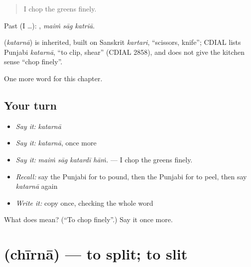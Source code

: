 \begin{quote}
I chop the greens finely.
\end{quote}

Past (I …):   , \emph{maiṁ sāg katriā}.

\begin{cousinweb}
\textbf{} (\emph{katarnā}) is inherited, built on Sanskrit \emph{kartari}, \textquotedblleft{}scissors, knife\textquotedblright{}; CDIAL lists Punjabi \emph{katarnā}, \textquotedblleft{}to clip, shear\textquotedblright{} (CDIAL 2858), and does not give the kitchen sense \textquotedblleft{}chop finely\textquotedblright{}.
\end{cousinweb}

\begin{grammarlens}[title={What you've built}]
One more word for this chapter.
\end{grammarlens}

\subsection*{Your turn}
\begin{itemize}
\raggedright
  \item \emph{Say it:} \emph{katarnā}
  \item \emph{Say it:} \emph{katarnā}, once more
  \item \emph{Say it:} \emph{maiṁ sāg katardī hāṁ.} — I chop the greens finely.
  \item \emph{Recall:} say the Punjabi for to pound, then the Punjabi for to peel, then say \emph{katarnā} again
  \item \emph{Write it:} copy \textbf{} once, checking the whole word
\end{itemize}

\begin{tcolorbox}[breakable,colback=teal!4,colframe=teal!35!black,title={Before you move on}]
What does  mean? (\textquotedblleft{}To chop finely\textquotedblright{}.) Say it once more.
\end{tcolorbox}
\section[\texorpdfstring{\pa{ਚੀਰਨਾ} (chīrnā)}{ਚੀਰਨਾ (chīrnā)}]{ (chīrnā) — to split; to slit}

\label{lesson:PA-C241-chirna}



